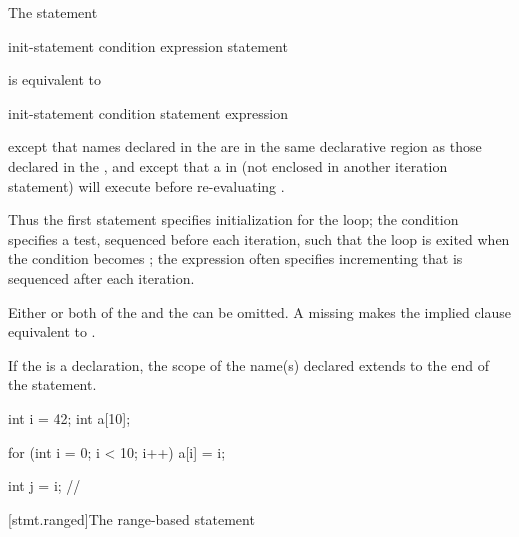 \pnum
The  statement

\begin{ncbnf}
 init-statement condition\opt{} \terminal{;} expression\opt{} \terminal{)} statement
\end{ncbnf}

is equivalent to

\begin{ncbnftab}
\terminal{\{}\br
\>init-statement\br
\> condition \terminal{) \{}\br
\>\>statement\br
\>\>expression \terminal{;}\br
\>\terminal{\}}\br
\terminal{\}}
\end{ncbnftab}

except that names declared in the  are in
the same declarative region as those declared in the
, and except that a
%
 in  (not enclosed in another
iteration statement) will execute  before
re-evaluating .
\begin{note}
Thus the first statement specifies initialization for the loop; the
condition specifies a test, sequenced before each
iteration, such that the loop is exited when the condition becomes
; the expression often specifies incrementing that is
sequenced after each iteration.
\end{note}

\pnum
Either or both of the 
and the  can be omitted.
A missing 
makes the implied  clause
equivalent to .

\pnum
{}%
%
If the  is a declaration, the scope of the
name(s) declared extends to the end of the  statement.
\begin{example}

\begin{codeblock}
int i = 42;
int a[10];

for (int i = 0; i < 10; i++)
  a[i] = i;

int j = i;          // 
\end{codeblock}
\end{example}

[stmt.ranged]{The range-based  statement}%

